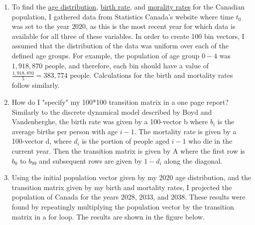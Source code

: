 \documentclass[10pt]{article}
\begin{document}
\noindent{}
\normalsize
\begin{enumerate}[leftmargin=\labelsep]
    \item 
    To find the \href{https://www150.statcan.gc.ca/t1/tbl1/en/tv.action?pid=1710000501}{age distribution}, \href{https://www150.statcan.gc.ca/t1/tbl1/en/tv.action?pid=1310041801}{birth rate}, 
    and \href{https://www150.statcan.gc.ca/t1/tbl1/en/tv.action?pid=1310071001}{morality rates} for the Canadian population, I gathered data from Statistics Canada's website where time
    $t_0$ was set to the year $2020$, as this is the most recent year for which data is available for all three of these variables. In order to
    create 100 bin vectors, I assumed that the distribution of the data was uniform over each of the defined age groups. For example, the population 
    of age group $0-4$ was $1,918,870$ people, and therefore, each bin should have a value of $\frac{1,918,870}{5} = 383,774$ people. Calculations for the birth and mortality rates
     follow similarly.
        
    \item How do I "specify" my 100*100 transition matrix in a one page report? Similarly to the discrete dynamical model described by Boyd and 
    Vandenberghe, the birth rate was given by a 100-vector b where $b_i$ is the average births per person with age $i-1$. The mortality
    rate is given by a 100-vector d, where $d_i$ is the portion of people aged $i-1$ who die in the current year. Then the transition matrix
    is given by A where the first row is $b_0$ to $b_{99}$ and subsequent rows are given by $1-d_i$ along the diagonal.
    
    \item Using the initial population vector given by my 2020 age distribution, and the transition matrix given by my birth and mortality rates, 
    I projected the population of Canada for the years 2028, 2033, and 2038. These results were found by repeatingly multiplying the population vector
    by the transition matrix in a for loop. The results are shown in the figure below.


\end{enumerate}
\end{document}
